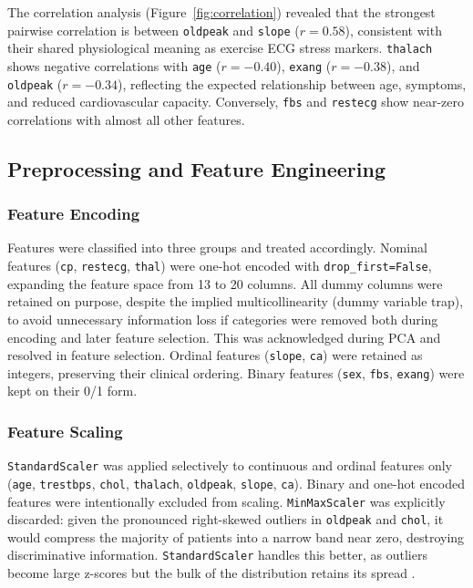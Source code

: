 \documentclass[twocolumn, fontsize=10pt]{article}
\begin{document}
The correlation analysis (Figure~\ref{fig:correlation}) revealed that the strongest pairwise correlation is between \texttt{oldpeak} and \texttt{slope} ($r = 0.58$), consistent with their shared physiological meaning as exercise ECG stress markers. \texttt{thalach} shows negative correlations with \texttt{age} ($r = -0.40$), \texttt{exang} ($r = -0.38$), and \texttt{oldpeak} ($r = -0.34$), reflecting the expected relationship between age, symptoms, and reduced cardiovascular capacity. Conversely, \texttt{fbs} and \texttt{restecg} show near-zero correlations with almost all other features.

\subsection{Preprocessing and Feature Engineering}

\subsubsection{Feature Encoding}

Features were classified into three groups and treated accordingly.  {Nominal
features} (\texttt{cp}, \texttt{restecg}, \texttt{thal}) were one-hot encoded with \texttt{drop\_first=False}, expanding the feature space from 13 to 20 columns. All dummy columns were retained on purpose, despite the implied multicollinearity (dummy variable trap), to avoid unnecessary information loss if categories were removed both during encoding and later feature selection. This was acknowledged during PCA and resolved in feature selection.  {Ordinal features}
(\texttt{slope}, \texttt{ca}) were retained as integers, preserving their
clinical ordering.  {Binary features} (\texttt{sex}, \texttt{fbs},
\texttt{exang}) were kept on their 0/1 form.

\subsubsection{Feature Scaling}

\texttt{StandardScaler} was applied selectively to continuous and ordinal features only
(\texttt{age}, \texttt{trestbps}, \texttt{chol}, \texttt{thalach},
\texttt{oldpeak}, \texttt{slope}, \texttt{ca}). Binary and one-hot encoded
features were intentionally excluded from scaling. \texttt{MinMaxScaler} was explicitly
discarded: given the pronounced right-skewed outliers in \texttt{oldpeak} and
\texttt{chol}, it would compress the majority of patients into a narrow band near
zero, destroying discriminative information. \texttt{StandardScaler} handles this better,
as outliers become large z-scores but the bulk of the distribution retains its
spread \citep{hastie2009elements}.
\end{document}
